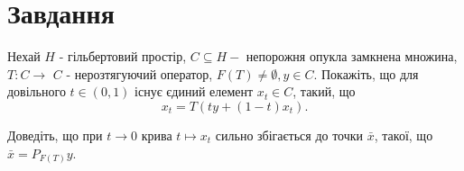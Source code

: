 
\chapter{Завдання \theHchapter}

\begin{tcolorbox}[title=Завдання]
    Нехай $H$ - гільбертовий простір, $C \subseteq H-$ непорожня опукла замкнена множина, $T: C \rightarrow$ $C$ - нерозтягуючий оператор, $F(T) \neq \emptyset, y \in C$. Покажіть, що для довільного $t \in(0,1)$ існує єдиний елемент $x_{t} \in C$, такий, що
    $$
    x_{t}=T\left(t y+(1-t) x_{t}\right) .
    $$

    Доведіть, що при $t \rightarrow 0$ крива $t \mapsto x_{t}$ сильно збігається до точки $\bar{x}$, такої, що $\bar{x}=P_{F(T)} y$.


\end{tcolorbox}

